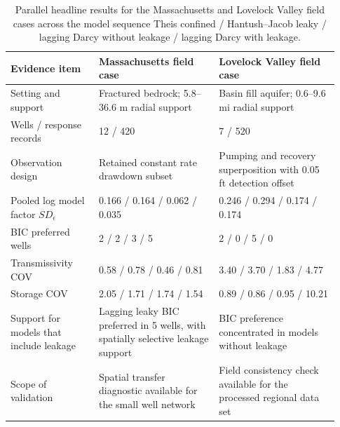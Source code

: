\documentclass[12pt]{article}
\begin{document}
\begin{table}[!htbp]
\centering
\scriptsize
\setlength{\tabcolsep}{2.2pt}
\renewcommand{\arraystretch}{0.95}
\caption{Parallel headline results for the Massachusetts and Lovelock Valley field cases across the model sequence Theis confined / Hantush--Jacob leaky / lagging Darcy without leakage / lagging Darcy with leakage.}
\label{tab:s_headline}
\begin{tabular}{@{}p{0.25\linewidth}p{0.34\linewidth}p{0.34\linewidth}@{}}
\toprule
Evidence item & Massachusetts field case & Lovelock Valley field case \\
\midrule
Setting and support & Fractured bedrock; 5.8--36.6 m radial support & Basin fill aquifer; 0.6--9.6 mi radial support \\
Wells / response records & 12 / 420 & 7 / 520 \\
Observation design & Retained constant rate drawdown subset & Pumping and recovery superposition with 0.05 ft detection offset \\
Pooled log model factor $SD_{\epsilon}$ & 0.166 / 0.164 / 0.062 / 0.035 & 0.246 / 0.294 / 0.174 / 0.174 \\
BIC preferred wells & 2 / 2 / 3 / 5 & 2 / 0 / 5 / 0 \\
Transmissivity COV & 0.58 / 0.78 / 0.46 / 0.81 & 3.40 / 3.70 / 1.83 / 4.77 \\
Storage COV & 2.05 / 1.71 / 1.74 / 1.54 & 0.89 / 0.86 / 0.95 / 10.21 \\
Support for models that include leakage & Lagging leaky BIC preferred in 5 wells, with spatially selective leakage support & BIC preference concentrated in models without leakage \\
Scope of validation & Spatial transfer diagnostic available for the small well network & Field consistency check available for the processed regional data set \\
\bottomrule
\end{tabular}
\end{table}
\end{document}

